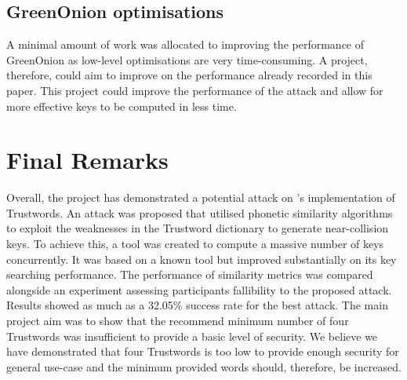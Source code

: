 \subsection*{GreenOnion optimisations}
A minimal amount of work was allocated to improving the performance of GreenOnion as low-level optimisations are very time-consuming. A project, therefore, could aim to improve on the performance already recorded in this paper. This project could improve the performance of the attack and allow for more effective keys to be computed in less time.   

\section{Final Remarks}
Overall, the project has demonstrated a potential attack on \pep's implementation of Trustwords. An attack was proposed that utilised phonetic similarity algorithms to exploit the weaknesses in the Trustword dictionary to generate near-collision keys. To achieve this, a tool was created to compute a massive number of keys concurrently. It was based on a known tool but improved substantially on its key searching performance. The performance of similarity metrics was compared alongside an experiment assessing participants fallibility to the proposed attack. Results showed as much as a 32.05\% success rate for the best attack. The main project aim was to show that the recommend minimum number of four Trustwords was insufficient to provide a basic level of security. We believe we have demonstrated that four Trustwords is too low to provide enough security for general use-case and the minimum provided words should, therefore, be increased.